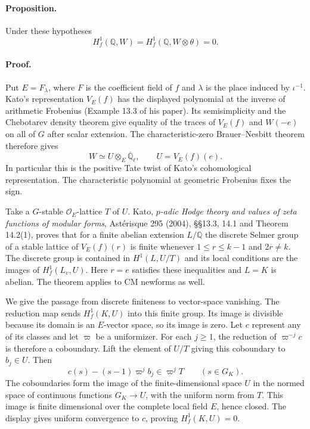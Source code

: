 \paragraph{Proposition.}
Under these hypotheses
\[
 H^1_f(\mathbb Q,W)=H^1_f(\mathbb Q,W\otimes\theta)=0 .
 \tag{K1}
\]

\paragraph{Proof.}
Put \(E=F_\lambda\), where \(F\) is the coefficient field of \(f\)
and \(\lambda\) is the place induced by \(\iota^{-1}\).
Kato's representation \(V_E(f)\) has the displayed polynomial
at the inverse of arithmetic Frobenius (Example 13.3 of his paper).
Its semisimplicity and the Chebotarev density theorem give equality of
the traces of \(V_E(f)\) and \(W(-e)\) on all of \(G\) after scalar
extension. The characteristic-zero Brauer--Nesbitt theorem therefore
gives
\[
 W\simeq U\otimes_E\overline{\mathbb Q}_\ell,\qquad U=V_E(f)(e).
\]
In particular this is the positive Tate twist of Kato's cohomological
representation. The characteristic polynomial at geometric Frobenius
fixes the sign.

Take a \(G\)-stable \(\mathcal O_E\)-lattice \(T\) of \(U\).
Kato, \emph{\(p\)-adic Hodge theory and values of zeta functions of
modular forms}, Ast\'erisque 295 (2004), \S\S13.3, 14.1 and
Theorem 14.2(1), proves that for a finite abelian extension
\(L/\mathbb Q\) the discrete Selmer group of a stable lattice of
\(V_E(f)(r)\) is finite whenever \(1\le r\le k-1\) and \(2r\ne k\).
The discrete group is contained in \(H^1(L,U/T)\) and its local
conditions are the images of \(H^1_f(L_v,U)\).
Here \(r=e\) satisfies these inequalities and \(L=K\) is abelian.
The theorem applies to CM newforms as well.

We give the passage from discrete finiteness to vector-space
vanishing. The reduction map sends \(H^1_f(K,U)\) into this finite
group. Its image is divisible because its domain is an \(E\)-vector
space, so its image is zero. Let \(c\) represent any of its classes
and let \(\varpi\) be a uniformizer. For each \(j\ge1\), the reduction
of \(\varpi^{-j}c\) is therefore a coboundary. Lift the element of
\(U/T\) giving this coboundary to \(b_j\in U\). Then
\[
 c(s)-(s-1)\varpi^j b_j\in\varpi^jT\qquad(s\in G_K).
\]
The coboundaries form the image of the finite-dimensional space \(U\)
in the normed space of continuous functions \(G_K\to U\), with the
uniform norm from \(T\). This image is finite dimensional over the
complete local field \(E\), hence closed. The display gives uniform
convergence to \(c\), proving \(H^1_f(K,U)=0\).


